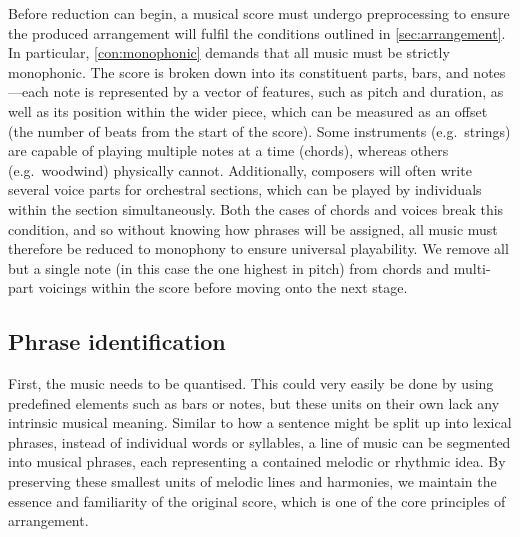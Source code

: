 \documentclass[12pt]{article}
\theoremstyle{definition}
\begin{document}
Before reduction can begin, a musical score must undergo preprocessing to ensure the produced arrangement will fulfil the conditions outlined in \cref{sec:arrangement}. In particular, \cref{con:monophonic} demands that all music must be strictly monophonic. The score is broken down into its constituent parts, bars, and notes---each note is represented by a vector of features, such as pitch and duration, as well as its position within the wider piece, which can be measured as an offset (the number of beats from the start of the score). Some instruments (e.g.\ strings) are capable of playing multiple notes at a time (chords), whereas others (e.g.\ woodwind) physically cannot. Additionally, composers will often write several voice parts for orchestral sections, which can be played by individuals within the section simultaneously. Both the cases of chords and voices break this condition, and so without knowing how phrases will be assigned, all music must therefore be reduced to monophony to ensure universal playability. We remove all but a single note (in this case the one highest in pitch) from chords and multi-part voicings within the score before moving onto the next stage.

\subsection{Phrase identification}

First, the music needs to be quantised. This could very easily be done by using predefined elements such as bars or notes, but these units on their own lack any intrinsic musical meaning. Similar to how a sentence might be split up into lexical phrases, instead of individual words or syllables, a line of music can be segmented into musical phrases, each representing a contained melodic or rhythmic idea. By preserving these smallest units of melodic lines and harmonies, we maintain the essence and familiarity of the original score, which is one of the core principles of arrangement.
\end{document}
